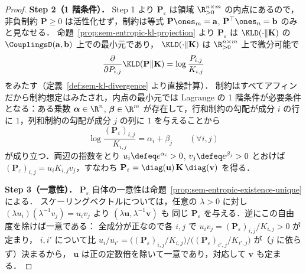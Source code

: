 \begin{proof}
  \textbf{Step 2（1 階条件）．}
  Step 1 より $\mathbf{P}_\varepsilon$ は領域 $\R_{>0}^{n \times m}$ の内点にあるので，
  非負制約 $\mathbf{P} \geq 0$ は活性化せず，制約は等式 $\mathbf{P}\ones_m = \mathbf{a}$,
  $\mathbf{P}^\top\ones_n = \mathbf{b}$ のみと見なせる．
  命題~\ref{prop:sem-entropic-kl-projection} より $\mathbf{P}_\varepsilon$ は
  $\KLD(\cdot \| \mathbf{K})$ の $\CouplingsD(\mathbf{a}, \mathbf{b})$ 上での最小元であり，
  $\KLD(\cdot \| \mathbf{K})$ は $\R_{>0}^{n \times m}$ 上で微分可能で
  \[
    \frac{\partial}{\partial P_{i,j}} \KLD(\mathbf{P} \| \mathbf{K})
    = \log\frac{P_{i,j}}{K_{i,j}}
  \]
  をみたす（定義~\ref{def:sem-kl-divergence} より直接計算）．
  制約はすべてアフィンだから制約想定はみたされ，内点の最小元では Lagrange の
  1 階条件が必要条件となる：ある乗数 $\boldsymbol{\alpha} \in \R^n$, $\boldsymbol{\beta} \in \R^m$
  が存在して，行和制約の勾配が成分 $i$ の行に $1$，列和制約の勾配が成分 $j$ の列に $1$ を与えることから
  \[
    \log\frac{(\mathbf{P}_\varepsilon)_{i,j}}{K_{i,j}} = \alpha_i + \beta_j
    \qquad (\forall i, j)
  \]
  が成り立つ．両辺の指数をとり $u_i \defeq e^{\alpha_i} > 0$, $v_j \defeq e^{\beta_j} > 0$ とおけば
  $(\mathbf{P}_\varepsilon)_{i,j} = u_i K_{i,j} v_j$，すなわち
  $\mathbf{P}_\varepsilon = \diag(\mathbf{u})\,\mathbf{K}\,\diag(\mathbf{v})$ を得る．

  \textbf{Step 3（一意性）．}
  $\mathbf{P}_\varepsilon$ 自体の一意性は命題~\ref{prop:sem-entropic-existence-unique} による．
  スケーリングベクトルについては，任意の $\lambda > 0$ に対し
  $(\lambda u_i)(\lambda^{-1} v_j) = u_i v_j$ より $(\lambda\mathbf{u}, \lambda^{-1}\mathbf{v})$ も
  同じ $\mathbf{P}_\varepsilon$ を与える．逆にこの自由度を除けば一意である：
  全成分が正なので各 $i, j$ で $u_i v_j = (\mathbf{P}_\varepsilon)_{i,j} / K_{i,j} > 0$ が定まり，
  $i, i'$ について比 $u_i / u_{i'} = \bigl((\mathbf{P}_\varepsilon)_{i,j}/K_{i,j}\bigr)
  \big/ \bigl((\mathbf{P}_\varepsilon)_{i',j}/K_{i',j}\bigr)$ が（$j$ に依らず）決まるから，
  $\mathbf{u}$ は正の定数倍を除いて一意であり，対応して $\mathbf{v}$ も定まる．
\end{proof}


